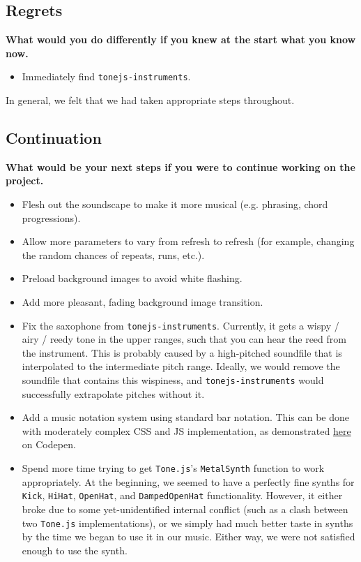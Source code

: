 \documentclass[12pt,a4paper]{article}
\newcommand{\code}{\texttt}
\newcommand{\lightcode}[1]{\colorbox{light-gray}{\texttt{#1}}}
\begin{document}
\subsection{Regrets}
\textbf{What would you do differently if you knew at the start what you know now.}
\begin{itemize}
	\item Immediately find \lightcode{tonejs-instruments}.
\end{itemize}

In general, we felt that we had taken appropriate steps throughout.

\subsection{Continuation}
\textbf{What would be your next steps if you were to continue working on the project.}
\begin{itemize}
	\item Flesh out the soundscape to make it more musical (e.g. phrasing, chord progressions).
	\item Allow more parameters to vary from refresh to refresh (for example, changing the random chances of repeats, runs, etc.).
	\item Preload background images to avoid white flashing.
	\item Add more pleasant, fading background image transition.
	\item Fix the saxophone from \lightcode{tonejs-instruments}. Currently, it gets a wispy / airy / reedy tone in the upper ranges, such that you can hear the reed from the instrument. This is probably caused by a high-pitched soundfile that is interpolated to the intermediate pitch range. Ideally, we would remove the soundfile that contains this wispiness, and \lightcode{tonejs-instruments} would successfully extrapolate pitches without it.
	\item Add a music notation system using standard bar notation. This can be done with moderately complex CSS and JS implementation, as demonstrated \href{https://codepen.io/laviperchik/pen/mIACq}{here} on Codepen. \cite{css-musical-notes}
	\item Spend more time trying to get \lightcode{Tone.js}'s \code{MetalSynth} function to work appropriately. At the beginning, we seemed to have a perfectly fine synths for \code{Kick}, \code{HiHat}, \code{OpenHat}, and \code{DampedOpenHat} functionality. However, it either broke due to some yet-unidentified internal conflict (such as a clash between two \lightcode{Tone.js} implementations), or we simply had much better taste in synths by the time we began to use it in our music. Either way, we were not satisfied enough to use the synth.
\end{itemize}
\end{document}
